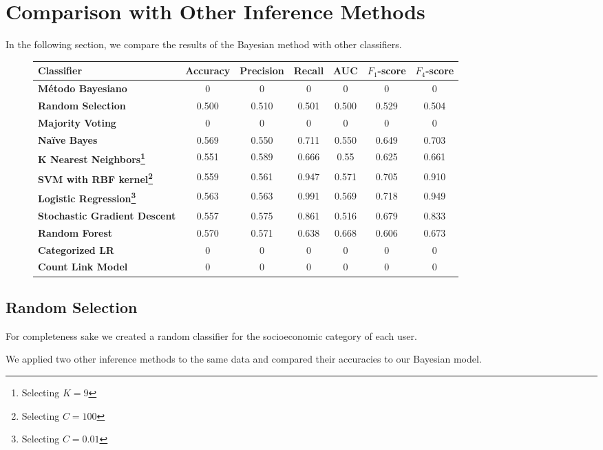 \section{Comparison with Other Inference Methods}
\label{sec:comparison}

In the following section, we compare the results of the Bayesian method with other classifiers.

\begin{figure}
	\begin{tabularx}{\textwidth}{>{\bfseries}X c c c c c c}
		\toprule
		\textbf{Classifier} & \textbf{Accuracy} & \textbf{Precision} & \textbf{Recall} & \textbf{AUC} & \textbf{$F_1$}-\textbf{score} & \textbf{$F_4$}-\textbf{score} \\
		\midrule
		Método Bayesiano & 0 & 0 & 0 & 0 & 0 & 0 \\
		\midrule
		Random Selection & 0.500 & 0.510 & 0.501 & 0.500 & 0.529 & 0.504 \\
		Majority Voting & 0 & 0 & 0 & 0 & 0 & 0 \\
		\midrule
		Naïve Bayes & 0.569 & 0.550 & 0.711 & 0.550 & 0.649 & 0.703 \\
		K Nearest Neighbors\footnote{Selecting $K = 9$} & 0.551 & 0.589 & 0.666 & 0.55 & 0.625 & 0.661 \\
		SVM with RBF kernel\footnote{Selecting $C = 100$} & 0.559 & 0.561 & 0.947 & 0.571 & 0.705 & 0.910 \\
		Logistic Regression\footnote{Selecting $C = 0.01$} & 0.563 & 0.563 & 0.991 & 0.569 & 0.718 & 0.949 \\
		Stochastic Gradient Descent & 0.557 & 0.575 & 0.861 & 0.516 & 0.679 & 0.833 \\
		Random Forest & 0.570 & 0.571 & 0.638 & 0.668 & 0.606 & 0.673 \\
		\midrule
		Categorized LR & 0 & 0 & 0 & 0 & 0 & 0 \\
		Count Link Model & 0 & 0 & 0 & 0 & 0 & 0 \\
		\bottomrule
	\end{tabularx}
\end{figure}

\subsection{Random Selection}

For completeness sake we created a random classifier for the socioeconomic category of each user.

We applied two other inference methods to the same data and compared their accuracies to our Bayesian model.

